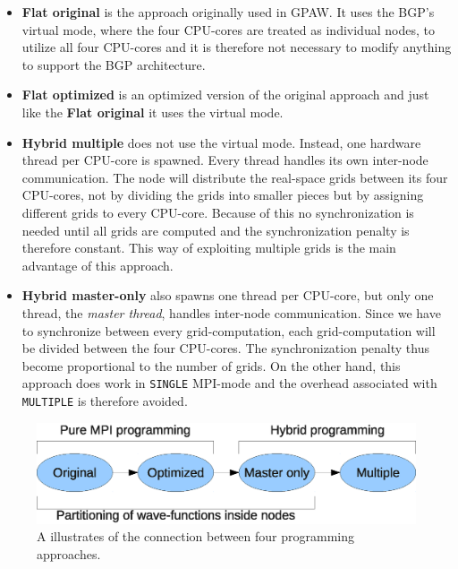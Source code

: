 \documentclass[preprint,3p,times,twocolumn]{elsarticle}
\begin{document}
\begin{itemize}
 \item \textbf{Flat original} is the approach originally used in GPAW. It uses the BGP's virtual mode, where the four CPU-cores are treated as individual nodes, to utilize all four CPU-cores and it is therefore not necessary to modify anything to support the BGP architecture.

 \item \textbf{Flat optimized} is an optimized version of the original approach and just like the \textbf{Flat original} it uses the virtual mode.

 \item \textbf{Hybrid multiple} does not use the virtual mode. Instead, one hardware thread per CPU-core is spawned. Every thread handles its own inter-node communication. The node will distribute the real-space grids between its four CPU-cores, not by dividing the grids into smaller pieces but by assigning different grids to every CPU-core. Because of this no synchronization is needed until all grids are computed and the synchronization penalty is therefore constant. This way of exploiting multiple grids is the main advantage of this approach.

 \item \textbf{Hybrid master-only} also spawns one thread per CPU-core, but only one thread, the \emph{master thread}, handles inter-node communication. Since we have to synchronize between every grid-computation, each grid-computation will be divided between the four CPU-cores. The synchronization penalty thus become proportional to the number of grids. On the other hand, this approach does work in \texttt{SINGLE} MPI-mode and the overhead associated with \texttt{MULTIPLE} is therefore avoided.
\end{itemize}

\begin{figure}
 \centering
 \includegraphics[width=\linewidth]{gfx/approaches}
 \caption{A illustrates of the connection between four programming approaches.}
 \label{fig:approaches}
\end{figure}
\end{document}
